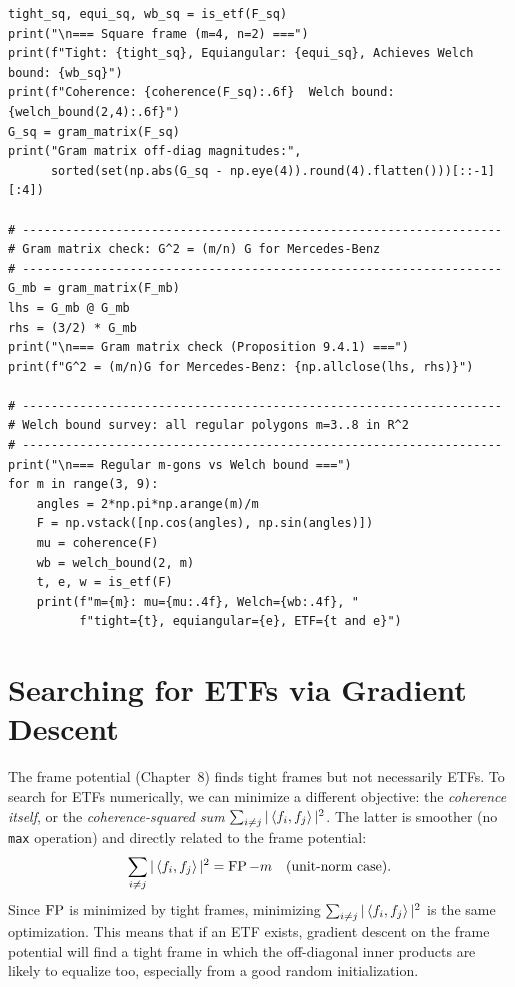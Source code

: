 \begin{lstlisting}[caption={Coherence, Welch bound, and ETF verification in NumPy}]
tight_sq, equi_sq, wb_sq = is_etf(F_sq)
print("\n=== Square frame (m=4, n=2) ===")
print(f"Tight: {tight_sq}, Equiangular: {equi_sq}, Achieves Welch bound: {wb_sq}")
print(f"Coherence: {coherence(F_sq):.6f}  Welch bound: {welch_bound(2,4):.6f}")
G_sq = gram_matrix(F_sq)
print("Gram matrix off-diag magnitudes:",
      sorted(set(np.abs(G_sq - np.eye(4)).round(4).flatten()))[::-1][:4])

# -------------------------------------------------------------------
# Gram matrix check: G^2 = (m/n) G for Mercedes-Benz
# -------------------------------------------------------------------
G_mb = gram_matrix(F_mb)
lhs = G_mb @ G_mb
rhs = (3/2) * G_mb
print("\n=== Gram matrix check (Proposition 9.4.1) ===")
print(f"G^2 = (m/n)G for Mercedes-Benz: {np.allclose(lhs, rhs)}")

# -------------------------------------------------------------------
# Welch bound survey: all regular polygons m=3..8 in R^2
# -------------------------------------------------------------------
print("\n=== Regular m-gons vs Welch bound ===")
for m in range(3, 9):
    angles = 2*np.pi*np.arange(m)/m
    F = np.vstack([np.cos(angles), np.sin(angles)])
    mu = coherence(F)
    wb = welch_bound(2, m)
    t, e, w = is_etf(F)
    print(f"m={m}: mu={mu:.4f}, Welch={wb:.4f}, "
          f"tight={t}, equiangular={e}, ETF={t and e}")
\end{lstlisting}

\section{Searching for ETFs via Gradient Descent}
\label{sec:etf-search}

The frame potential (Chapter~8) finds tight frames but not necessarily
ETFs. To search for ETFs numerically, we can minimize a different
objective: the \emph{coherence itself}, or the \emph{coherence-squared
sum} $\sum_{i\ne j}|\left\langle f_i, f_j \right\rangle|^2$. The latter is smoother (no
\texttt{max} operation) and directly related to the frame potential:
\[
  \sum_{i\ne j}|\left\langle f_i, f_j \right\rangle|^2 = \operatorname{FP} - m \quad (\text{unit-norm case}).
\]
Since $\operatorname{FP}$ is minimized by tight frames, minimizing $\sum_{i\ne j}
|\left\langle f_i, f_j \right\rangle|^2$ is the same optimization. This means that if an
ETF exists, gradient descent on the frame potential will find a
tight frame in which the off-diagonal inner products are likely to
equalize too, especially from a good random initialization.


